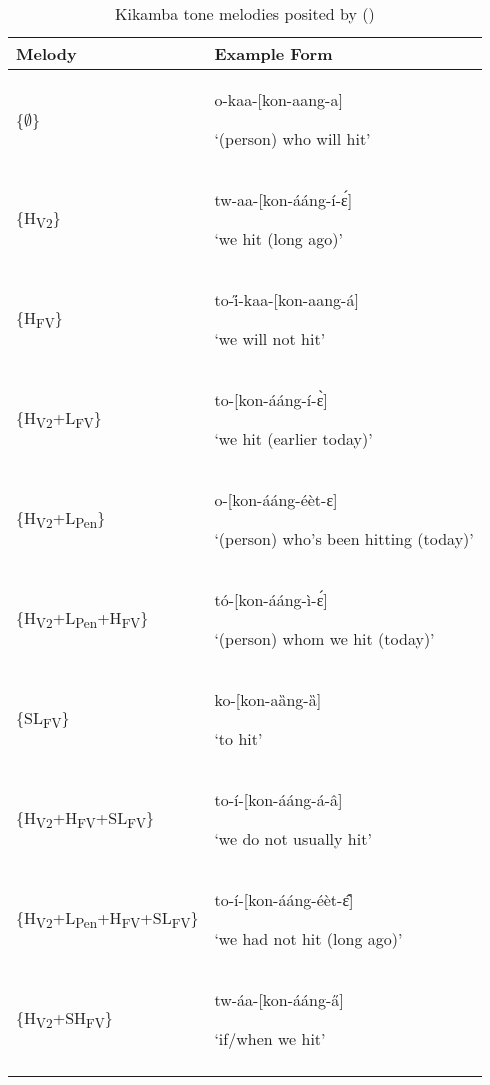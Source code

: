 \documentclass[output=paper,newtxmath,modfonts,nonflat,hidelinks]{langsci/langscibook}
\begin{document}
\begin{table}[t]
\begin{tabularx}{\textwidth}{lQ}
\lsptoprule
 Melody &  Example Form\\\midrule
\{${\emptyset}$\} & {o-kaa-[kon-aang-a]}

‘(person) who will hit’\\

\tablevspace
\{H\textsubscript{V2}\} & {tw-aa-[kon-ááng-í-\'ɛ]}

‘we hit (long ago)’\\

\tablevspace
\{H\textsubscript{FV}\} & {to-\H{i}-kaa-[kon-aang-á]}

‘we will not hit’\\

\tablevspace
\{H\textsubscript{V2}+L\textsubscript{FV}\} & {to-[kon-ááng-í-\`ɛ]}

‘we hit (earlier today)’\\

\tablevspace
\{H\textsubscript{V2}+L\textsubscript{Pen}\} & {o-[kon-ááng-éèt-ɛ]}

‘(person) who’s been hitting (today)’\\

\tablevspace
\{H\textsubscript{V2}+L\textsubscript{Pen}+H\textsubscript{FV}\} & {tó-[kon-ááng-ì-\'ɛ]}

‘(person) whom we hit (today)’\\

\tablevspace
\{SL\textsubscript{FV}\} & {ko-[kon-aȁng-ȁ]}

‘to hit’\\

\tablevspace
\{H\textsubscript{V2}+H\textsubscript{FV}+SL\textsubscript{FV}\} & {to-í-[kon-ááng-á-â]}

‘we do not usually hit’\\

\tablevspace
\{H\textsubscript{V2}+L\textsubscript{Pen}+H\textsubscript{FV}+SL\textsubscript{FV}\} & {to-í-[kon-ááng-éèt-\^ɛ]}

‘we had not hit (long ago)’\\

\tablevspace
\{H\textsubscript{V2}+SH\textsubscript{FV}\} & {tw-áa-[kon-ááng-\H{a}]}

‘if/when we hit’\\
\lspbottomrule 
\end{tabularx}
\caption{Kikamba tone melodies posited by \citeauthor{Roberts-Kohno2000} (\citeyear{Roberts-Kohno2000,Roberts-Kohno2014})}
\label{tab:jones:2}
\end{table}
\end{document}
